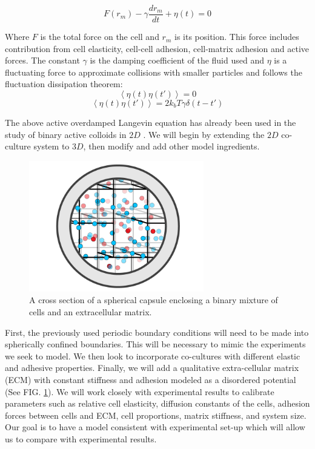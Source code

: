 \documentclass[aps,prb,twocolumn,groupedaddress,nofootinbib,floatfix]{revtex4}
\begin{document}
\begin{equation}
F(r _m) - \gamma \frac{dr_m}{dt} + \eta(t) = 0
\end{equation}

Where $F$ is the total force on the cell and $r_m$ is its position.
This force includes contribution from cell elasticity,
cell-cell adhesion, cell-matrix adhesion and active forces.
The constant $\gamma$ is the damping coefficient of the fluid used and $\eta$ is a fluctuating force to approximate collisions with smaller particles and follows the fluctuation dissipation theorem:
\begin{equation}
\left\langle \eta(t)\eta(t')\right\rangle = 0 
\end{equation}
\begin{equation}
\left\langle \eta(t)\eta(t')\right\rangle = 2k_bT\gamma
\delta(t-t')
\end{equation}

The above active overdamped Langevin equation \cite{RednerBaskaran,FilyMarchetti} has already been used in the study of binary active colloids in $2D$ \cite{Butcher}. 
We will begin by extending the $2D$ co-culture system to $3D$, then modify and add other model ingredients.

\begin{figure}
  \includegraphics[width=3in]{Fig2.png}
  \caption[capsuleECM]
   {A cross section of a spherical capsule enclosing a binary mixture of 
   cells and an extracellular matrix.}
   \label{fig:capsuleECM}
\end{figure}

First, the previously used periodic boundary conditions will need to be made into spherically confined boundaries.
This will be necessary to mimic the experiments we seek to model.
We then look to incorporate co-cultures with different elastic and adhesive properties. 
Finally, we will add a qualitative extra-cellular matrix (ECM) with constant stiffness and adhesion modeled as a disordered potential (See FIG. \ref{fig:capsuleECM}). 
We will work closely with experimental results to calibrate parameters such as relative cell elasticity, diffusion constants of the cells, adhesion forces between cells and ECM, cell proportions, matrix stiffness, and system size.
Our goal is to have a model consistent with experimental set-up which will allow us to compare with experimental results.
\end{document}
